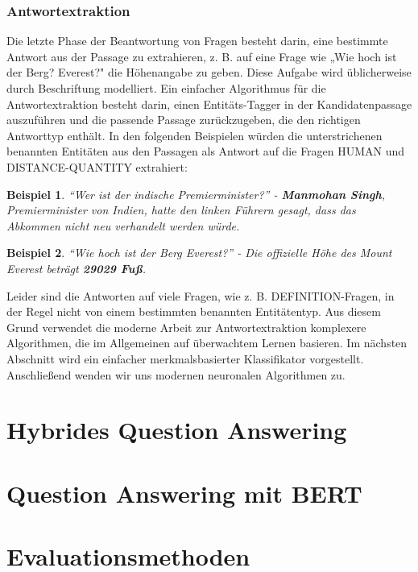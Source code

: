 \documentclass[
        ngerman,
        paper=a4,
        numbers=noendperiod,
]{scrreprt}
\begin{document}
\subsection{Antwortextraktion}
Die letzte Phase der Beantwortung von Fragen besteht darin, eine bestimmte Antwort aus der Passage zu extrahieren, z. B. auf eine Frage wie „Wie hoch ist der Berg? Everest?" die Höhenangabe zu geben. Diese Aufgabe wird üblicherweise durch Beschriftung modelliert. 
Ein einfacher Algorithmus für die Antwortextraktion besteht darin, einen Entitäts-Tagger in der Kandidatenpassage auszuführen und die passende Passage zurückzugeben, die den richtigen Antworttyp enthält. 
In den folgenden Beispielen würden die unterstrichenen benannten Entitäten aus den Passagen als Antwort auf die Fragen HUMAN und DISTANCE-QUANTITY extrahiert:

\newtheorem{example}{Beispiel}

\begin{example}
\enquote{Wer ist der indische Premierminister?} - \textbf{Manmohan Singh}, Premierminister von Indien, hatte den linken Führern gesagt, dass das Abkommen nicht neu verhandelt werden würde.

\end{example}
\begin{example}
\enquote{Wie hoch ist der Berg Everest?} - Die offizielle Höhe des Mount Everest beträgt \textbf{29029 Fuß}.
\end{example}

Leider sind die Antworten auf viele Fragen, wie z. B. DEFINITION-Fragen, in der Regel nicht von einem bestimmten benannten Entitätentyp. Aus diesem Grund verwendet die moderne Arbeit zur Antwortextraktion komplexere Algorithmen, die im Allgemeinen auf überwachtem Lernen basieren. Im nächsten Abschnitt wird ein einfacher merkmalsbasierter Klassifikator vorgestellt. Anschließend wenden wir uns modernen neuronalen Algorithmen zu.



\chapter{Hybrides Question Answering}

\chapter{Question Answering mit BERT }
\chapter{Evaluationsmethoden}
\end{document}
